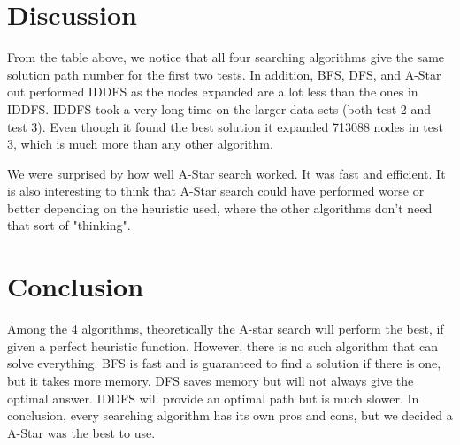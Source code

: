 \documentclass[onecolumn,draftclsnofoot, 10pt, compsoc]{IEEEtran}
\begin{document}
	
	
	
	
	\section{Discussion}
	From the table above, we notice that all four searching algorithms give the same solution path number for the first two tests. In addition, BFS, DFS, and A-Star out performed IDDFS as the nodes expanded are a lot less than the ones in IDDFS. 
    \indent IDDFS took a very long time on the larger data sets (both test 2 and test 3). Even though it found the best solution it expanded 713088 nodes in test 3, which is much more than any other algorithm.
	
	We were surprised by how well A-Star search worked. It was fast and efficient. It is also interesting to think that A-Star search could have performed worse or better depending on the heuristic used, where the other algorithms don't need that sort of "thinking".
	
	
	
	
	\section{Conclusion}
	Among the 4 algorithms, theoretically the A-star search will perform the best, if given a perfect heuristic function. However, there is no such algorithm that can solve everything. BFS is fast and is guaranteed to find a solution if there is one, but it takes more memory. DFS saves memory but will not always give the optimal answer. IDDFS will provide an optimal path but is much slower. In conclusion, every searching algorithm has its own pros and cons, but we decided a A-Star was the best to use. 
    
	
\end{document}
